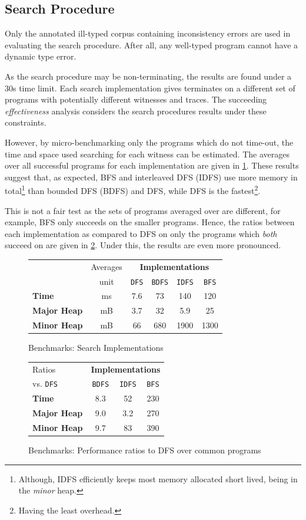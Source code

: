 \subsection{Search Procedure}
Only the annotated ill-typed corpus containing inconsistency errors are used in evaluating the search procedure. After all, any well-typed program cannot have a dynamic type error.

As the search procedure may be non-terminating, the results are found under a 30s time limit. Each search implementation gives terminates on a different set of programs with potentially different witnesses and traces. The succeeding \textit{effectiveness} analysis considers the search procedures results under these constraints.

However, by micro-benchmarking only the programs which do not time-out, the time and space used searching for each witness can be estimated. The averages over all successful programs for each implementation are given in \cref{fig:SearchPerformance}. These results suggest that, as expected, BFS and interleaved DFS (IDFS) use more memory in total\footnote{Although, IDFS efficiently keeps most memory allocated short lived, being in the \textit{minor} heap.} than bounded DFS (BDFS) and DFS, while DFS is the fastest\footnote{Having the least overhead.}. 

This is not a fair test as the sets of programs averaged over are different, for example, BFS only succeeds on the smaller programs. Hence, the ratios between each implementation as compared to DFS on only the programs which \textit{both} succeed on are given in \cref{fig:SearchPerformanceRatios}. Under this, the results are even more pronounced.
\begin{figure}
  \centering
  \begin{tabular}{lc|cccc}
  & Averages & \multicolumn{4}{c}{\textbf{Implementations}}\\
   & unit & \texttt{DFS} & \texttt{BDFS} & \texttt{IDFS} & \texttt{BFS}\\
   \hline
   \textbf{Time} & ms &  7.6 & 73 & 140 & 120\\
   \textbf{Major Heap} & mB & 3.7 & 32 & 5.9 & 25\\
   \textbf{Minor Heap} & mB & 66 & 680 & 1900 & 1300
  \end{tabular}
  
\caption{Benchmarks: Search Implementations}
\label{fig:SearchPerformance}
\end{figure}
\begin{figure}
  \centering
  \begin{tabular}{l|ccc}
  Ratios & \multicolumn{3}{c}{\textbf{Implementations}}\\
    vs. \texttt{DFS}& \texttt{BDFS} & \texttt{IDFS} & \texttt{BFS} \\
   \hline
   \textbf{Time} &  8.3 & 52 & 230\\
   \textbf{Major Heap} & 9.0 & 3.2 & 270\\
   \textbf{Minor Heap} & 9.7 & 83 & 390
  \end{tabular}
  
\caption{Benchmarks: Performance ratios to DFS over common programs}
\label{fig:SearchPerformanceRatios}
\end{figure}


